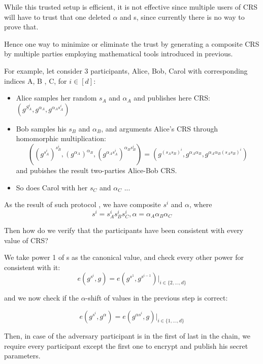 \documentclass[a4paper,11pt]{article}
\begin{document}
While this trusted setup is efficient, it is not effective since multiple users of CRS will have to trust that one deleted $\alpha$ and s, since currently there is no way to prove that.

Hence one way to minimize or eliminate the trust by generating a composite CRS by multiple parties employing mathematical tools introduced in previous.

For example, let consider 3 participants, Alice, Bob, Carol with corresponding indices A, B , C, for $i \in [d]$:

\begin{itemize}
\item Alice samples her random $s_A$ and $\alpha_A$ and publishes here CRS:  $(g^{S_A^i}, g^{\alpha_A}, g^{\alpha_A s_A^i})$
\item Bob samples his $s_B$ and $\alpha_B$, and arguments Alice's CRS through homomorphic multiplication:
\begin{displaymath}
((g^{s_A^i})^{s_B^i}, (g^{\alpha_A})^{\alpha_B}, (g^{\alpha_A s_A^i})^{\alpha_B s_B^i} )  = (g^{(s_A s_B)^i}, g^{\alpha_A \alpha_B}, g^{\alpha_A \alpha_B (s_A s_B)^i})
\end{displaymath}
and pubishes the result two-parties Alice-Bob CRS. 
\item So does Carol with her $s_C$ and $\alpha_C$ ...
\end{itemize}

As the result of such protocol , we have composite $s^i$ and $\alpha$, where 
\begin{equation}
s^i = s_A^i s_B^i s_C^i,  \alpha = \alpha_A \alpha_B \alpha_C
\end{equation}

Then how do we verify that the participants have been consistent with every value of CRS? 

We take power 1 of s as the canonical value, and check every other power for consistent with it:
\begin{displaymath}
e(g^{s^i}, g) = e(g^{s^1}, g^{s^{i-1}}) |_{i \in \{2, ..., d\}}
\end{displaymath}

and we now check if the $\alpha$-shift of values in the previous step is correct:

\begin{displaymath}
e(g^{s^i}, g^{\alpha}) = e(g^{\alpha{s^i}}, g) |_{i \in \{1, ..., d\}}
\end{displaymath}

Then, in case of the adversary participant is in the first of last in the chain, we require every participant except the first one to encrypt and publish his	 secret parameters.  
\end{document}
